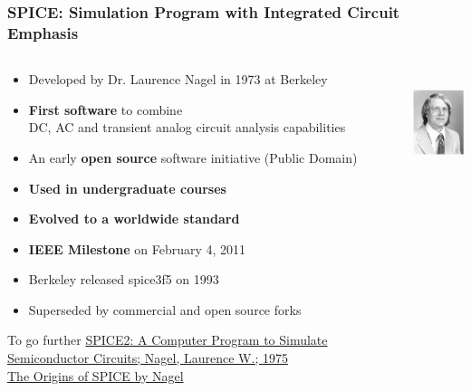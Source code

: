 
\begin{frame}
  \frametitle{SPICE: Simulation Program with Integrated Circuit Emphasis}
  \begin{columns}
    \begin{column}{.7\textwidth}
      \begin{itemize}
      \item Developed by Dr. Laurence Nagel in 1973 at Berkeley %
      \item \textbf{First software} to combine \\
        DC, AC and transient analog circuit analysis capabilities
      \item An early \textbf{open source} software initiative (Public Domain)
      \item \textbf{Used in undergraduate courses}
      \item \textbf{Evolved to a worldwide standard} %
      \item \textbf{IEEE Milestone} on February 4, 2011
      \item Berkeley released spice3f5 on 1993 %
      \item Superseded by commercial and open source forks \\[1em]
      \end{itemize}
      {\tiny%
        \begin{tabbing}
          To go further \=%
          \href{https://www2.eecs.berkeley.edu/Pubs/TechRpts/1975/9602.html}%
          {SPICE2: A Computer Program to Simulate Semiconductor Circuits; Nagel, Laurence W.; 1975} \\
          \> \href{http://www.omega-enterprises.net/The\%20Origins\%20of\%20SPICE.html}{The Origins of SPICE by Nagel}
        \end{tabbing}%
      }
    \end{column}
    \begin{column}{.3\textwidth}
      \begin{center}
        \includegraphics[height=3cm]{images/Larry-Nagel-portrait-young.png} \\[1cm]

\end{center}
\end{column}
\end{columns}
\end{frame}
